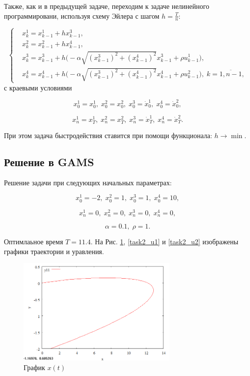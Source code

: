 \documentclass[14pt]{article}
\begin{document}
Также, как и в предыдущей задаче, переходим к задаче нелинейного программировани, используя схему Эйлера с шагом $h = \frac{T}{n}$:

\begin{equation}\label{NLP2}
\left\{ \begin{aligned}
& x^1_{k} = x^1_{k-1} + h x^3_{k-1}, \\
& x^2_{k} = x^2_{k-1} + h x^4_{k-1}, \\
& x^3_{k} = x^3_{k-1} + h \Big(-\alpha \sqrt{(x^3_{k-1})^2+(x^4_{k-1})^2} x^3_{k-1} + \rho u^1_{k-1} \Big), \\
& x^4_{k} = x^4_{k-1} + h \Big(-\alpha \sqrt{(x^3_{k-1})^2+(x^4_{k-1})^2} x^4_{k-1} + \rho u^2_{k-1} \Big), \; k = \overline{1,n-1},
\end{aligned}\right.
\end{equation}
с краевыми условиями

$$
    x^1_0 = x^1_0,\; x^2_0 = x^2_0,\; x^3_0 = \dot x^1_0,\; x^4_0 = \dot x^2_0,
$$

$$
    x^1_n = x^1_T,\; x^2_n = x^2_T,\; x^3_n = \dot x^1_T,\; x^4_n = \dot x^2_T.
$$

При этом задача быстродействия ставится при помощи функционала: $h \rightarrow \min$.

\subsection{Решение в GAMS}

Решение задачи при следующих начальных параметрах:

$$
    x^1_0 = -2,\; x^2_0 = 1,\; x^3_0 = 1,\; x^4_0 = 10,
$$

$$
    x^1_n = 0,\; x^2_n = 0,\; x^3_n = 0,\; x^4_n = 0,
$$

$$
    \alpha = 0.1,\; \rho = 1.
$$

Оптимлаьное время $ T = 11.4 $. На Рис. \ref{task2_x}, \ref{task2_u1} и \ref{task2_u2} изображены графики траектории и уравления.

\begin{figure}
\centering
\includegraphics[width=0.7\textwidth]{task2_x}
\caption{График $x(t)$}
\label{task2_x}
\end{figure}
\end{document}
